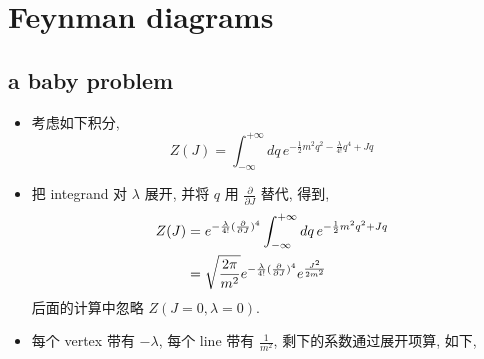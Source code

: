 \chapter{Feynman diagrams}
\section{a baby problem}
\begin{itemize}
	\item 考虑如下积分,
	\begin{equation}
		Z(J) = \int_{- \infty}^{+ \infty} dq \, e^{- \frac{1}{2} m^2 q^2 - \frac{\lambda}{4!} q^4 + J q}
	\end{equation}
	
	\item 把 integrand 对 $\lambda$ 展开, 并将 $q$ 用 $\frac{\partial}{\partial J}$ 替代, 得到,
	\begin{align}
		Z(J) &= e^{- \frac{\lambda}{4!} (\frac{\partial}{\partial J})^4} \int_{- \infty}^{+ \infty} dq \, e^{- \frac{1}{2} m^2 q^2 + J q} \notag \\
		&= \sqrt{\frac{2 \pi}{m^2}} e^{- \frac{\lambda}{4!} (\frac{\partial}{\partial J})^4} e^{\frac{J^2}{2 m^2}}
	\end{align}
	后面的计算中忽略 $Z(J = 0, \lambda = 0)$.
	
	\item 每个 vertex 带有 $- \lambda$, 每个 line 带有 $\frac{1}{m^2}$, 剩下的系数通过展开项算, 如下,
	

\end{itemize}
